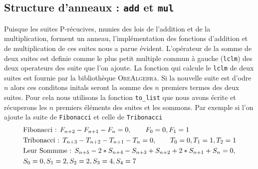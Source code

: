 \documentclass[12pt]{article}
\newlength{\charwidth}
\newcommand{\uline}{\underline{\hspace{2\charwidth}}}
\begin{document}
    \subsection{Structure d'anneaux : \texttt{\uline add\uline } et \texttt{\uline mul\uline}}
        Puisque les suites P-récucives, munies des lois de l'addition et de la multiplication,
        forment un anneau, l'implémentation des fonctions d'addition et de multiplication de ces suites
        nous a parue évident. L'opérateur de la somme de deux suites est definie comme le plus petit 
        multiple commun à gauche (\texttt{lclm}) des deux operateurs des suite que l'on ajoute.
        La fonction qui calcule le \texttt{lclm} de deux suites est fournie par la bibliothèque \textsc{OreAlgebra}. 
        Si la nouvelle suite est d'odre $n$ alors ces conditons initals seront la somme des 
        $n$ premiers termes des deux suites. Pour cela nous utilisons la fonction \texttt{to\_list} que nous avons écrite
        et récuperons les $n$ premiers éléments des suites et les sommons.
        Par exemple si l'on ajoute la suite de \texttt{Fibonacci} et celle de \texttt{Tribonacci}
        \begin{align*}
            &\textnormal{Fibonacci : } F_{n+2} - F_{n+1} - F_n = 0,\qquad F_0=0, F_1=1\\
            &\textnormal{Tribonacci : } T_{n+3} - T_{n+2} - T_{n+1} - T_n = 0,\qquad T_0 = 0, T_1 = 1, T_2 = 1\\
            &\textnormal{Leur Sommme : } S_{n+5} - 2*S_{n+4} - S_{n+3} + S_{n+2} + 2*S_{n+1} + S_n = 0,\\&S_0 = 0, S_1 = 2, S_2 = 2, S_3 = 4, S_4 = 7
        \end{align*} 
        
\end{document}
